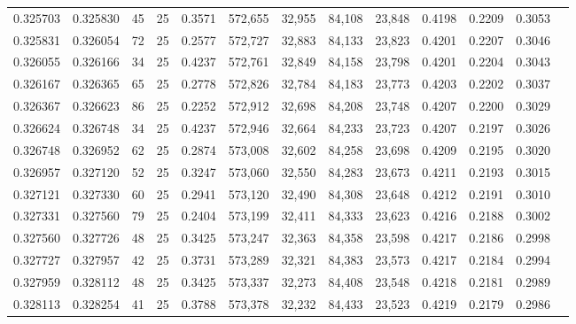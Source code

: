 \begin{tabular}{rrrrrrrrrrrrr}
0.325703 & 0.325830 &    45 &  25 &                                     0.3571 & 572,655 &  32,955 &  84,108 &  23,848 & 0.4198 & 0.2209 & 0.3053 \\
0.325831 & 0.326054 &    72 &  25 &                                     0.2577 & 572,727 &  32,883 &  84,133 &  23,823 & 0.4201 & 0.2207 & 0.3046 \\
0.326055 & 0.326166 &    34 &  25 &                                     0.4237 & 572,761 &  32,849 &  84,158 &  23,798 & 0.4201 & 0.2204 & 0.3043 \\
0.326167 & 0.326365 &    65 &  25 &                                     0.2778 & 572,826 &  32,784 &  84,183 &  23,773 & 0.4203 & 0.2202 & 0.3037 \\
0.326367 & 0.326623 &    86 &  25 &                                     0.2252 & 572,912 &  32,698 &  84,208 &  23,748 & 0.4207 & 0.2200 & 0.3029 \\
0.326624 & 0.326748 &    34 &  25 &                                     0.4237 & 572,946 &  32,664 &  84,233 &  23,723 & 0.4207 & 0.2197 & 0.3026 \\
0.326748 & 0.326952 &    62 &  25 &                                     0.2874 & 573,008 &  32,602 &  84,258 &  23,698 & 0.4209 & 0.2195 & 0.3020 \\
0.326957 & 0.327120 &    52 &  25 &                                     0.3247 & 573,060 &  32,550 &  84,283 &  23,673 & 0.4211 & 0.2193 & 0.3015 \\
0.327121 & 0.327330 &    60 &  25 &                                     0.2941 & 573,120 &  32,490 &  84,308 &  23,648 & 0.4212 & 0.2191 & 0.3010 \\
0.327331 & 0.327560 &    79 &  25 &                                     0.2404 & 573,199 &  32,411 &  84,333 &  23,623 & 0.4216 & 0.2188 & 0.3002 \\
0.327560 & 0.327726 &    48 &  25 &                                     0.3425 & 573,247 &  32,363 &  84,358 &  23,598 & 0.4217 & 0.2186 & 0.2998 \\
0.327727 & 0.327957 &    42 &  25 &                                     0.3731 & 573,289 &  32,321 &  84,383 &  23,573 & 0.4217 & 0.2184 & 0.2994 \\
0.327959 & 0.328112 &    48 &  25 &                                     0.3425 & 573,337 &  32,273 &  84,408 &  23,548 & 0.4218 & 0.2181 & 0.2989 \\
0.328113 & 0.328254 &    41 &  25 &                                     0.3788 & 573,378 &  32,232 &  84,433 &  23,523 & 0.4219 & 0.2179 & 0.2986 \\

\end{tabular}
